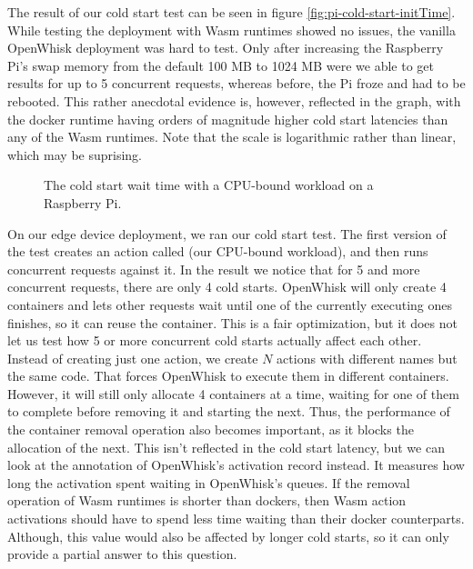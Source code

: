 The result of our cold start test can be seen in figure \ref{fig:pi-cold-start-initTime}. While testing the deployment with Wasm runtimes showed no issues, the vanilla OpenWhisk deployment was hard to test. Only after increasing the Raspberry Pi's swap memory from the default 100 MB to 1024 MB were we able to get results for up to 5 concurrent requests, whereas before, the Pi froze and had to be rebooted. This rather anecdotal evidence is, however, reflected in the graph, with the docker runtime having orders of magnitude higher cold start latencies than any of the Wasm runtimes. Note that the scale is logarithmic rather than linear, which may be suprising.


\begin{figure}
    \begin{center}
        
    \end{center}
    \caption{The cold start wait time with a CPU-bound workload on a Raspberry Pi.}
    \label{fig:pi-cold-start-waitTime}
\end{figure}

On our edge device deployment, we ran our cold start test. The first version of the test creates an action called  (our CPU-bound workload), and then runs concurrent requests against it. In the result we notice that for 5 and more concurrent requests, there are only 4 cold starts. OpenWhisk will only create 4 containers and lets other requests wait until one of the currently executing ones finishes, so it can reuse the container. This is a fair optimization, but it does not let us test how 5 or more concurrent cold starts actually affect each other. Instead of creating just one action, we create $N$ actions with different names but the same code. That forces OpenWhisk to execute them in different containers. However, it will still only allocate 4 containers at a time, waiting for one of them to complete before removing it and starting the next. Thus, the performance of the container removal operation also becomes important, as it blocks the allocation of the next. This isn't reflected in the cold start latency, but we can look at the  annotation of OpenWhisk's activation record instead. It measures how long the activation spent waiting in OpenWhisk's queues. If the removal operation of Wasm runtimes is shorter than dockers, then Wasm action activations should have to spend less time waiting than their docker counterparts. Although, this value would also be affected by longer cold starts, so it can only provide a partial answer to this question.

